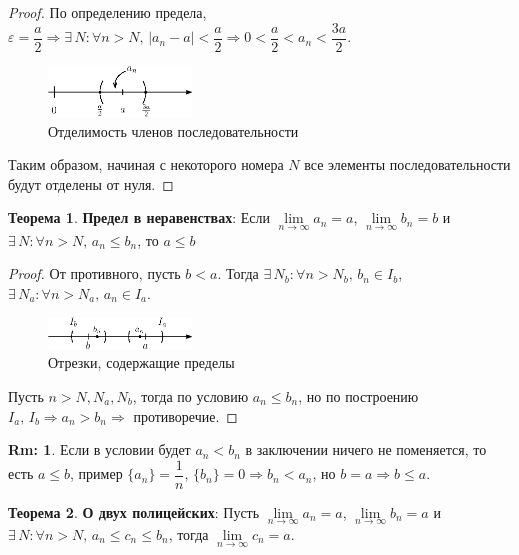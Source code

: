 \documentclass[12pt]{article}
\theoremstyle{definition}
\newtheorem{rem}{Rm:}
\newtheorem{theorem}{Теорема}
\begin{document}
\begin{proof}
	По определению предела, $\varepsilon = \dfrac{a}{2} \Rightarrow \exists \, N \colon \forall n > N, \, |a_n - a| < \dfrac{a}{2} \Rightarrow 0 < \dfrac{a}{2} < a_n < \dfrac{3a}{2}$. 
	\begin{figure}[H]
		\centering
		\includegraphics[width=0.34\textwidth]{8_6.eps}
		\caption{Отделимость членов последовательности}
		\label{fig:8_6}
	\end{figure}
	Таким образом, начиная с некоторого номера $N$ все элементы последовательности будут отделены от нуля.
\end{proof}
	
\begin{theorem}\textbf{Предел в неравенствах}:
	Если $\lim\limits_{n \rightarrow \infty}{a_n} = a$, $\lim\limits_{n \rightarrow \infty}{b_n} = b$ и $\exists \, N\colon \forall n > N, \, a_n \leq b_n$, то $a \leq b$
\end{theorem}

\begin{proof}
	От противного, пусть $b < a$. Тогда $\exists \, N_b \colon \forall n > N_b, \, b_n \in I_b$, $\exists \, N_a \colon \forall n > N_a, \, a_n \in I_a$.
	
	\begin{figure}[H]
		\centering
		\includegraphics[width=0.34\textwidth]{8_7.eps}
		\caption{Отрезки, содержащие пределы}
		\label{fig:8_7}
	\end{figure}
	
	Пусть $n > N, N_a, N_b$, тогда по условию $a_n \leq b_n$, но по построению $I_a,\, I_b \Rightarrow a_n > b_n \Rightarrow$ противоречие. 
\end{proof}
	
\begin{rem}
	Если в условии будет $a_n < b_n$ в заключении ничего не поменяется, то есть $a \leq b$, пример $\{a_n\} = \dfrac{1}{n}, \, \{b_n\} = 0 \Rightarrow b_n < a_n$, но $b = a \Rightarrow b \leq a$.
\end{rem}
	
	
\begin{theorem}\textbf{О двух полицейских}:
	Пусть  $\lim\limits_{n \rightarrow \infty}{a_n} = a$, $\lim\limits_{n \rightarrow \infty}{b_n} = a$ и $\exists \, N \colon \forall n > N, \, a_n \leq c_n \leq b_n$, тогда $\lim\limits_{n \rightarrow \infty}{c_n} = a$.
\end{theorem}
	
\end{document}
